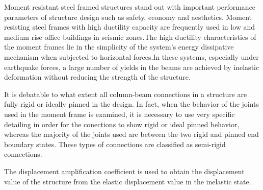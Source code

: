 Moment resistant steel framed structures stand out with important
performance parameters of structure design such as safety, economy
and aesthetics. Moment resisting steel frames with high ductility
capacity are frequently used in low and medium rise office buildings
in seismic zones.The high ductility characteristics of the moment
frames lie in the simplicity of the system's energy dissipative mechanism
when subjected to horizontal forces.In these systems, especially under
earthquake forces, a large number of yields in the beams are achieved
by inelastic deformation without reducing the strength of the structure.

It is debatable to what extent all column-beam connections in a structure
are fully rigid or ideally pinned in the design. In fact, when the
behavior of the joints used in the moment frame is examined, it is
necessary to use very specific detailing in order for the conections
to show rigid or ideal pinned behavior, whereas the majority of the
joints used are between the two rigid and pinned end boundary states.
These types of connections are classified as semi-rigid connections.

The displacement amplification coefficient is used to obtain the displacement
value of the structure from the elastic displacement value in the
inelastic state.
